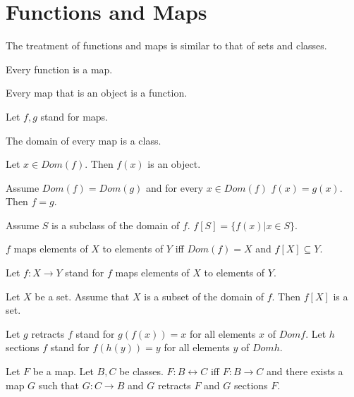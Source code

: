 \documentclass[11pt]{article}
\begin{document}
\section{Functions and Maps}
The treatment of functions and maps is similar to that
of sets and classes.
\begin{forthel}

\begin{lemma} Every function is a map.
\end{lemma}

\begin{lemma} Every map that is an object is a function.
\end{lemma}

Let $f, g$ stand for maps.

\begin{lemma} The domain of every map is a class.
\end{lemma}

\begin{lemma} Let $x \in Dom(f)$. Then $f(x)$ is an object.
\end{lemma}

\begin{lemma}  Assume $Dom(f)=Dom(g)$ and for every $x \in Dom(f)$
$f(x)=g(x)$. Then $f=g$.
\end{lemma}

\begin{definition}
Assume $S$ is a subclass of the domain of $f$.
$f[S] = \{ f(x) | x \in S \}$.
\end{definition}

\begin{definition}
    $f$ maps elements of $X$ to elements of $Y$ iff
    $Dom (f) = X$ and $f[X] \subseteq Y$.
\end{definition}
Let $f : X \rightarrow Y$ stand for $f$ maps elements of $X$ to elements of $Y$.


\begin{axiom} 
Let $X$ be a set.
Assume that $X$ is a subset of the domain of $f$.
Then $f[X]$ is a set.
\end{axiom}

Let $g$ retracts $f$ stand for $g(f(x)) = x$ for all elements $x$ of $Dom f$.
Let $h$ sections $f$ stand for $f(h(y)) = y$ for all elements $y$ of $Dom h$.

\begin{definition}
    Let $F$ be a map.
    Let $B, C$ be classes.
    $F : B\leftrightarrow C$ iff $F : B\rightarrow C$ and there exists a map $G$ such that
    $G : C\rightarrow B$ and
    $G$ retracts $F$ and $G$ sections $F$.
\end{definition}


\end{forthel}
\end{document}
